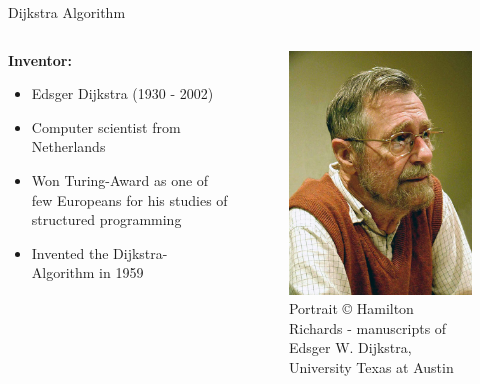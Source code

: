 \begin{frame}{Dijkstra Algorithm}
  \begin{columns}
    \begin{column}{0.6\linewidth}
      \textbf{Inventor:}
      \begin{itemize}
        \item
          Edsger Dijkstra (1930 - 2002)
        \item
          Computer scientist from Netherlands
        \item
          Won Turing-Award as one of few Europeans for his studies of 
          structured programming
        \item
          Invented the Dijkstra-Algorithm in 1959
      \end{itemize}
    \end{column}
    \begin{column}{0.4\linewidth}
      \begin{figure}
        \includegraphics[width=0.75\linewidth]
          {Images/Dijkstra/Edsger_Wybe_Dijkstra.jpg}
        \caption{Portrait \copyright\; Hamilton Richards - manuscripts of
          Edsger W. Dijkstra, University Texas at Austin}
        \label{fig:dijkstra:portrait}
      \end{figure}
    \end{column}
  \end{columns}
\end{frame}

